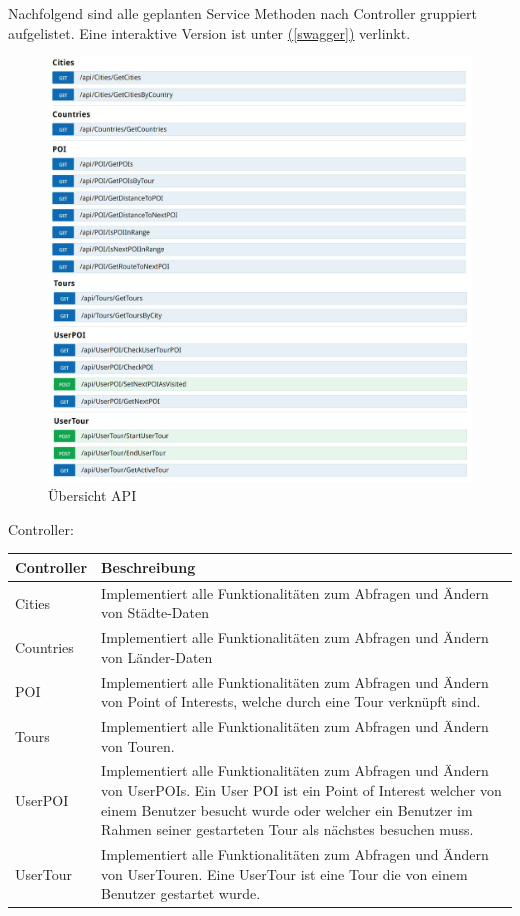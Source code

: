 \documentclass[a4paper,10pt,xetex]{article}
\newcommand*{\fullref}[1]{\hyperref[{#1}]{\nameref*{#1} (\ref*{#1})}}
\begin{document}
Nachfolgend sind alle geplanten Service Methoden nach Controller gruppiert aufgelistet. Eine
interaktive Version ist unter \fullref{swagger} verlinkt.

\begin{figure}
  \centering
  \includegraphics{swagger}
  \caption{Übersicht API}
\end{figure}

Controller:

\begin{longtabu} to \textwidth { | l | X[l] | }
\hline
\textbf{Controller} & \textbf{Beschreibung} \\
\hline
\endhead

Cities & Implementiert alle Funktionalit\"aten zum Abfragen und \"Andern von
  St\"adte-Daten\\ \hline
Countries & Implementiert alle Funktionalit\"aten zum Abfragen und \"Andern von
  L\"ander-Daten\\ \hline
POI & Implementiert alle Funktionalit\"aten zum Abfragen und \"Andern von Point of
Interests, welche durch eine Tour verkn\"upft sind.\\\hline
Tours & Implementiert alle Funktionalit\"aten zum Abfragen und \"Andern von Touren.\\\hline
UserPOI & Implementiert alle Funktionalit\"aten zum Abfragen und \"Andern von UserPOIs.
  Ein User POI ist ein Point of Interest welcher von einem Benutzer besucht wurde oder
  welcher ein Benutzer im Rahmen seiner gestarteten Tour als n\"achstes besuchen muss.\\\hline
UserTour & Implementiert alle Funktionalit\"aten zum Abfragen und \"Andern von UserTouren.
  Eine UserTour ist eine Tour die von einem Benutzer gestartet wurde.\\\hline
\end{longtabu}
\end{document}

